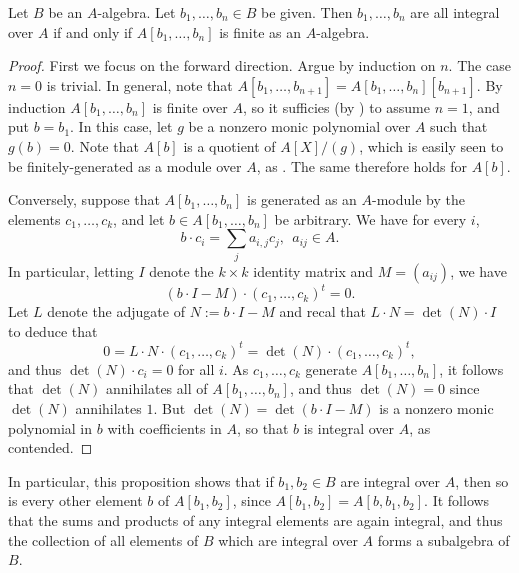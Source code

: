 \begin{proposition}
  Let $B$ be an $A$-algebra.
  Let $b_{1},\ldots,b_{n} \in B$ be given.
  Then $b_{1},\ldots,b_{n}$ are all integral over $A$ if and only if $A[b_{1},\ldots,b_{n}]$ is finite as an $A$-algebra.
\end{proposition}
\begin{proof}
  First we focus on the forward direction.
  Argue by induction on $n$.
  The case $n = 0$ is trivial.
  In general, note that $A[b_{1},\ldots,b_{n+1}] = A[b_{1},\ldots,b_{n}][b_{n+1}]$.
  By induction $A[b_{1},\ldots,b_{n}]$ is finite over $A$, so it sufficies (by ) to assume $n = 1$, and put $b = b_{1}$.
  In this case, let $g$ be a nonzero monic polynomial over $A$ such that $g(b) = 0$.
  Note that $A[b]$ is a quotient of $A[X]/(g)$, which is easily seen to be finitely-generated as a module over $A$, as .
  The same therefore holds for $A[b]$.

  Conversely, suppose that $A[b_{1},\ldots,b_{n}]$ is generated as an $A$-module by the elements $c_{1},\ldots,c_{k}$, and let $b \in A[b_{1},\ldots,b_{n}]$ be arbitrary.
  We have for every $i$,
  \[ b \cdot c_{i} = \sum_{j} a_{i,j} c_{j}, \ \ a_{ij} \in A. \]
  In particular, letting $I$ denote the $k \times k$ identity matrix and $M = (a_{ij})$, we have
  \[ (b \cdot I - M) \cdot (c_{1},\ldots,c_{k})^{t} = 0. \]
  Let $L$ denote the adjugate of $N := b \cdot I - M$ and recal that $L \cdot N = \det(N) \cdot I$ to deduce that
  \[ 0 = L \cdot N \cdot (c_{1},\ldots,c_{k})^{t} = \det(N) \cdot (c_{1},\ldots,c_{k})^{t}, \]
  and thus $\det(N) \cdot c_{i} = 0$ for all $i$.
  As $c_{1},\ldots,c_{k}$ generate $A[b_{1},\ldots,b_{n}]$, it follows that $\det(N)$ annihilates all of $A[b_{1},\ldots,b_{n}]$, and thus $\det(N) = 0$ since $\det(N)$ annihilates $1$.
  But $\det(N) = \det(b \cdot I - M)$ is a nonzero monic polynomial in $b$ with coefficients in $A$, so that $b$ is integral over $A$, as contended.
\end{proof}

In particular, this proposition shows that if $b_{1},b_{2} \in B$ are integral over $A$, then so is every other element $b$ of $A[b_{1},b_{2}]$, since $A[b_{1},b_{2}] = A[b,b_{1},b_{2}]$.
It follows that the sums and products of any integral elements are again integral, and thus the collection of all elements of $B$ which are integral over $A$ forms a subalgebra of $B$.


